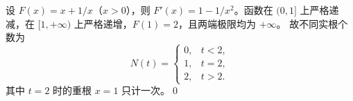 设 $F(x)=x+1/x$（$x>0$），则 $F'(x)=1-1/x^2$。函数在 $(0,1]$ 上严格递减，在 $[1,+\infty)$ 上严格递增，$F(1)=2$，且两端极限均为 $+\infty$。
故不同实根个数为
\[
\boxed{N(t)=\begin{cases}0,&t<2,\\1,&t=2,\\2,&t>2.\end{cases}}
\]
其中 $t=2$ 时的重根 $x=1$ 只计一次。\qed
